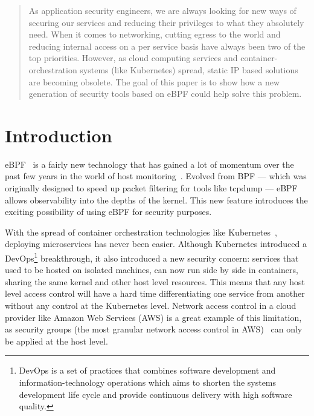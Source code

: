


\maketitle
{}

\begin{abstract}
  As application security engineers, we are always looking for new ways of securing our services and reducing their privileges to what they absolutely need. When it comes to networking, cutting egress to the world and reducing internal access on a per service basis have always been two of the top priorities. However, as cloud computing services and container-orchestration systems (like Kubernetes) spread, static IP based solutions are becoming obsolete. The goal of this paper is to show how a new generation of security tools based on eBPF could help solve this problem.
\end{abstract}

\section{Introduction}

eBPF~\cite{ProcessLevelNetworkSecurityMonitoring:LorenzoFontanaDavidCalavera,ProcessLevelNetworkSecurityMonitoring:GregMarsden} is a fairly new technology that has gained a lot of momentum over the past few years in the world of host monitoring~\cite{ProcessLevelNetworkSecurityMonitoring:BrendanGregg}. Evolved from BPF — which was originally designed to speed up packet filtering for tools like tcpdump — eBPF allows observability into the depths of the kernel. This new feature introduces the exciting possibility of using eBPF for security purposes.

With the spread of container orchestration technologies like Kubernetes~\cite{ProcessLevelNetworkSecurityMonitoring:JohnArundelJustinDomingus}, deploying microservices has never been easier. Although Kubernetes introduced a DevOps\footnote{DevOps is a set of practices that combines software development and information-technology operations which aims to shorten the systems development life cycle and provide continuous delivery with high software quality.} breakthrough, it also introduced a new security concern: services that used to be hosted on isolated machines, can now run side by side in containers, sharing the same kernel and other host level resources. This means that any host level access control will have a hard time differentiating one service from another without any control at the Kubernetes level. Network access control in a cloud provider like Amazon Web Services (AWS) is a great example of this limitation, as security groups (the most granular network access control in AWS)~\cite{ProcessLevelNetworkSecurityMonitoring:HeartinKanikathottu} can only be applied at the host level.

